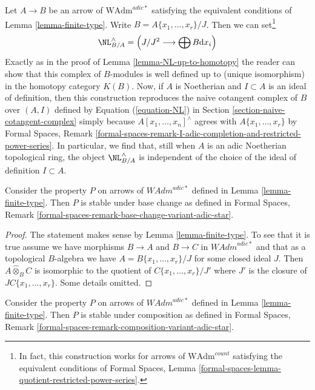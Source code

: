 \begin{remark}
\label{remark-NL-well-defined-topological}
Let $A \to B$ be an arrow of $\text{WAdm}^{adic*}$ satisfying the equivalent
conditions of Lemma \ref{lemma-finite-type}. Write
$B = A\{x_1, \ldots, x_r\}/J$. Then we can set\footnote{In fact, this
construction works for arrows of $\text{WAdm}^{count}$ satisfying the
equivalent conditions of Formal Spaces, Lemma
\ref{formal-spaces-lemma-quotient-restricted-power-series}.}
$$
\NL_{B/A}^\wedge = \left(J/J^2 \longrightarrow \bigoplus B\text{d}x_i\right)
$$
Exactly as in the proof of Lemma \ref{lemma-NL-up-to-homotopy}
the reader can show that this complex of $B$-modules is
well defined up to (unique isomorphism) in the homotopy category $K(B)$.
Now, if $A$ is Noetherian and $I \subset A$ is an ideal of definition,
then this construction reproduces the naive cotangent complex
of $B$ over $(A, I)$ defined by Equation (\ref{equation-NL})
in Section \ref{section-naive-cotangent-complex} simply because
$A[x_1, \ldots, x_n]^\wedge$ agrees with $A\{x_1, \ldots, x_r\}$ by
Formal Spaces, Remark
\ref{formal-spaces-remark-I-adic-completion-and-restricted-power-series}.
In particular, we find that, still when $A$ is an adic Noetherian
topological ring, the object $\NL_{B/A}^\wedge$ is independent
of the choice of the ideal of definition $I \subset A$.
\end{remark}

\begin{lemma}
\label{lemma-base-change-finite-type}
Consider the property $P$ on arrows of $\textit{WAdm}^{adic*}$ defined in
Lemma \ref{lemma-finite-type}. Then $P$ is stable under base change as
defined in Formal Spaces, Remark
\ref{formal-spaces-remark-base-change-variant-adic-star}.
\end{lemma}

\begin{proof}
The statement makes sense by Lemma \ref{lemma-finite-type}.
To see that it is true assume we have morphisms
$B \to A$ and $B \to C$ in $\textit{WAdm}^{adic*}$
and that as a topological $B$-algebra we have
$A = B\{x_1, \ldots, x_r\}/J$ for some closed ideal $J$.
Then $A \widehat{\otimes}_B C$ is isomorphic to the
quotient of $C\{x_1, \ldots, x_r\}/J'$ where
$J'$ is the closure of $JC\{x_1, \ldots, x_r\}$.
Some details omitted.
\end{proof}

\begin{lemma}
\label{lemma-composition-finite-type}
Consider the property $P$ on arrows of $\textit{WAdm}^{adic*}$ defined in
Lemma \ref{lemma-finite-type}. Then $P$ is stable under composition as
defined in Formal Spaces, Remark
\ref{formal-spaces-remark-composition-variant-adic-star}.
\end{lemma}

